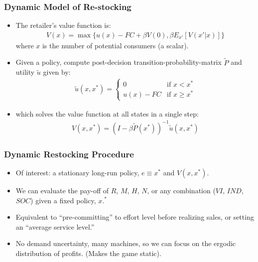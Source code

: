 \documentclass[aspectratio=169,11pt]{beamer}
\begin{document}
\begin{frame}
\frametitle{Dynamic Model of Re-stocking}
\begin{itemize}
\item The retailer's value function is:
\begin{eqnarray}
\label{bellman}
V(x) = \max \{u(x) - FC + \beta V(0), \beta E_{x'}[V(x' | x)]\}
\end{eqnarray}
where $x$ is the number of potential consumers (a scalar).
\item Given a policy, compute post-decision transition-probability-matrix $\tilde{P}$ and utility $\tilde{u}$ given by:
\begin{eqnarray*}
 \tilde{u}(x,x^{*})= \begin{cases} 0 &\mbox{if } x < x^{*} \\ 
u(x) - FC & \mbox{if } x \geq x^{*}
 \end{cases}
\end{eqnarray*}
\item which solves the value function at all states in a single step:
\begin{eqnarray}
\label{pistep}
V(x,x^{*}) = (I - \beta \tilde{P}(x^{*}))^{-1} \tilde{u}(x,x^{*}) 
\end{eqnarray}
\end{itemize}
\end{frame}


\begin{frame}
\frametitle{Dynamic Restocking Procedure}
\small
\begin{itemize}
\item Of interest: a stationary long-run policy, $e \equiv x^{*}$ and $V(x,x^{*}).$
\item We can evaluate the pay-off of $R$, $M$, $H$, $N$, or any combination ($VI$, $IND$, $SOC$) given a fixed policy, $x.^*$
\item Equivalent to ``pre-committing'' to effort level before realizing sales, or setting an ``average service level.'' 
\item No demand uncertainty, many machines, so we can focus on the ergodic distribution of profits. (Makes the game static).
\end{itemize}
\end{frame}
\end{document}
